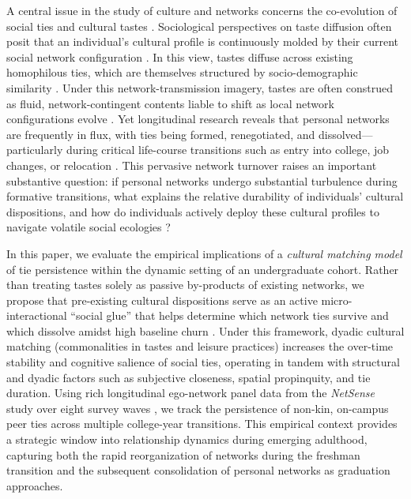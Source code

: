 \documentclass[
  letterpaper,
  DIV=11,
  numbers=noendperiod]{scrartcl}
\begin{document}
A central issue in the study of culture and networks concerns the co-evolution of social ties and cultural tastes \citep{lizardo2006, edelmann2014cultural-a77}. Sociological perspectives on taste diffusion often posit that an individual's cultural profile is continuously molded by their current social network configuration \citep{mark1998b, mcpherson2004blau-9fe}. In this view, tastes diffuse across existing homophilous ties, which are themselves structured by socio-demographic similarity \citep{lazarsfeld1954, mcpherson2001, feld2009homophily-595}. Under this network-transmission imagery, tastes are often construed as fluid, network-contingent contents liable to shift as local network configurations evolve \citep{mark2003}. Yet longitudinal research reveals that personal networks are frequently in flux, with ties being formed, renegotiated, and dissolved—particularly during critical life-course transitions such as entry into college, job changes, or relocation \citep{burt2000, wellman1997, kleinbaum2018reorganization-4a1, roy2022turnover, weiss2022life, kempnich2024how, vacchiano2024networked}. This pervasive network turnover raises an important substantive question: if personal networks undergo substantial turbulence during formative transitions, what explains the relative durability of individuals' cultural dispositions, and how do individuals actively deploy these cultural profiles to navigate volatile social ecologies \citep{bourdieu1984, holt1998}?

In this paper, we evaluate the empirical implications of a \textit{cultural matching model} of tie persistence within the dynamic setting of an undergraduate cohort. Rather than treating tastes solely as passive by-products of existing networks, we propose that pre-existing cultural dispositions serve as an active micro-interactional ``social glue'' that helps determine which network ties survive and which dissolve amidst high baseline churn \citep{burt2000}. Under this framework, dyadic cultural matching (commonalities in tastes and leisure practices) increases the over-time stability and cognitive salience of social ties, operating in tandem with structural and dyadic factors such as subjective closeness, spatial propinquity, and tie duration. Using rich longitudinal ego-network panel data from the \textit{NetSense} study over eight survey waves \citep{bahulkar2016analysis-d8b, bahulkar2017co-evolution-d04, hachen2022generators-923}, we track the persistence of non-kin, on-campus peer ties across multiple college-year transitions. This empirical context provides a strategic window into relationship dynamics during emerging adulthood, capturing both the rapid reorganization of networks during the freshman transition and the subsequent consolidation of personal networks as graduation approaches.
\end{document}
